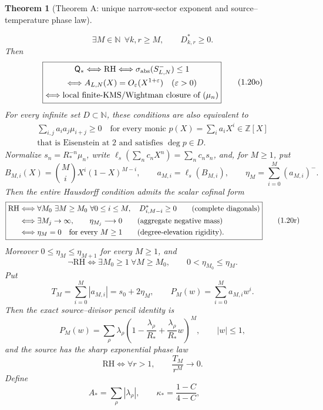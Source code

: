 \documentclass[11pt]{article}
\newtheorem{theorem}{Theorem}[section]
\begin{document}
\begin{theorem}[Theorem A: unique narrow-sector exponent and source--temperature phase law]
\begin{enumerate}[label=\textup{(\roman*)}]
\[ \exists M\in\mathbb N\ \ \forall k,r\ge M,\qquad D^*_{k,r}\ge0.
 \tag{1.20n}
\]
Then
\[
 \boxed{\begin{gathered}
 \mathsf Q_*\Longleftrightarrow\mathrm{RH}
 \Longleftrightarrow\sigma_{\rm abs}(S_{L,N}^-)\le1\\
 \Longleftrightarrow
 A_{L,N}(X)=O_\varepsilon(X^{1+\varepsilon})\quad(\varepsilon>0)\\
 \Longleftrightarrow
 \text{local finite-KMS/Wightman closure of }(\mu_n)
 \end{gathered}}
 \tag{1.20o}
\]
For every infinite set $D\subset\mathbb N$, these conditions are also equivalent to
\[
 \begin{gathered}
 \sum_{i,j}a_i a_j\mu_{i+j}\ge0
 \quad\text{for every monic }p(X)=\sum_i a_iX^i\in\mathbb Z[X]\\
 \text{that is Eisenstein at }2\text{ and satisfies }\deg p\in D.
 \end{gathered}
 \tag{1.20p}
\]
Normalize $s_n=R_*^{-n}\mu_n$, write
$\ell_s(\sum_nc_nX^n)=\sum_nc_ns_n$, and, for $M\ge1$, put
\[
 B_{M,i}(X)=\binom MiX^i(1-X)^{M-i},\qquad
 a_{M,i}=\ell_s(B_{M,i}),\qquad
 \eta_M=\sum_{i=0}^M(a_{M,i})^-.
 \tag{1.20q}
\]
Then the entire Hausdorff condition admits the scalar cofinal form
\[
 \boxed{\begin{aligned}
 \mathrm{RH}
 &\Longleftrightarrow
 \forall M_0\ \exists M\ge M_0\ \forall 0\le i\le M,
       \quad D^*_{i,M-i}\ge0\qquad\text{(complete diagonals)}\\
 &\Longleftrightarrow
 \exists M_j\to\infty,\qquad \eta_{M_j}\longrightarrow0
       \qquad\text{(aggregate negative mass)}\notag\\
 &\Longleftrightarrow
 \eta_M=0\quad\text{for every }M\ge1
       \qquad\text{(degree-elevation rigidity).}
 \end{aligned}}
 \tag{1.20r}
\]
Moreover $0\le\eta_M\le\eta_{M+1}$ for every $M\ge1$, and
\[
 \neg\mathrm{RH}
 \Longleftrightarrow
 \exists M_0\ge1\ \forall M\ge M_0,\qquad
 0<\eta_{M_0}\le\eta_M.
 \tag{1.20s}
\]
Put
\[
 T_M=\sum_{i=0}^M|a_{M,i}|=s_0+2\eta_M,
 \qquad
 P_M(w)=\sum_{i=0}^Ma_{M,i}w^i.
 \tag{1.20t}
\]
Then the exact source--divisor pencil identity is
\[
 P_M(w)=\sum_\rho\lambda_\rho
 \left(1-\frac{\lambda_\rho}{R_*}
       +\frac{\lambda_\rho}{R_*}w\right)^M,
 \qquad |w|\le1,
 \tag{1.20u}
\]
and the source has the sharp exponential phase law
\[
 \boxed{\mathrm{RH}\Longleftrightarrow
 \forall r>1,\qquad \frac{T_M}{r^M}\longrightarrow0.}
 \tag{1.20v}
\]
Define
\[
 A_*=\sum_\rho|\lambda_\rho|,\qquad
 \kappa_*=\frac{1-C}{4-C},\qquad
\]
\end{enumerate}
\end{theorem}
\end{document}
